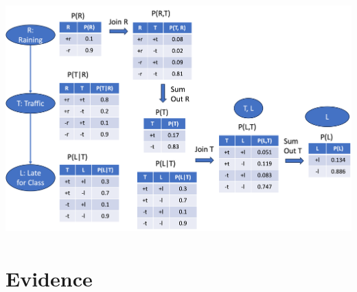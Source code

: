 \documentclass[11pt,a4paper]{report}
\begin{document}
\includegraphics[width=14cm, height = 9cm]{traffic_eg3.png}

\section{Evidence}
\end{document}

